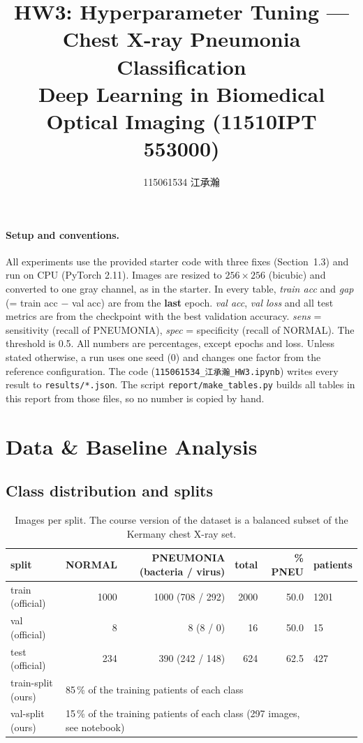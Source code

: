 \documentclass[10pt]{article}
\title{HW3: Hyperparameter Tuning --- Chest X-ray Pneumonia Classification\\\large Deep Learning in Biomedical Optical Imaging (11510IPT 553000)}
\author{115061534 江承瀚}
\date{}
\begin{document}
\maketitle

\paragraph{Setup and conventions.}
All experiments use the provided starter code with three fixes (Section~1.3) and run on CPU (PyTorch 2.11).
Images are resized to $256\times256$ (bicubic) and converted to one gray channel, as in the starter.
In every table, \emph{train acc} and \emph{gap} (= train acc $-$ val acc) are from the \textbf{last} epoch.
\emph{val acc}, \emph{val loss} and all test metrics are from the checkpoint with the best validation accuracy.
\emph{sens} = sensitivity (recall of PNEUMONIA), \emph{spec} = specificity (recall of NORMAL). The threshold is 0.5.
All numbers are percentages, except epochs and loss.
Unless stated otherwise, a run uses one seed (0) and changes one factor from the reference configuration.
The code (\texttt{115061534\_江承瀚\_HW3.ipynb}) writes every result to \texttt{results/*.json}.
The script \texttt{report/make\_tables.py} builds all tables in this report from those files, so no number is copied by hand.

\section{Data \& Baseline Analysis}
\subsection{Class distribution and splits}
\begin{table}[H]\centering\small
\caption{Images per split. The course version of the dataset is a balanced subset of the Kermany chest X-ray set.}
\begin{tabular}{lrrrrl}\toprule
split & NORMAL & PNEUMONIA (bacteria / virus) & total & \% PNEU & patients\\\midrule
train (official) & 1000 & 1000 (708 / 292) & 2000 & 50.0 & 1201\\
val (official) & 8 & 8 (8 / 0) & 16 & 50.0 & 15\\
test (official) & 234 & 390 (242 / 148) & 624 & 62.5 & 427\\\midrule
train-split (ours) & \multicolumn{4}{l}{85\,\% of the training patients of each class} & \\
val-split (ours) & \multicolumn{4}{l}{15\,\% of the training patients of each class (297 images, see notebook)} & \\
\bottomrule\end{tabular}\end{table}
\end{document}
